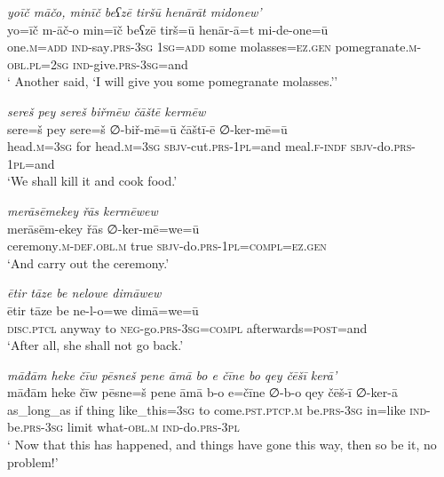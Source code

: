\ea \label{ZP.120}
\textit{yoīč māčo, minīč beʕzē tiršū henārāt midonew’} \\ 
\gll yo=īč m-āč-o min=īč beʕzē tirš=ū henār-ā=t mi-de-one=ū \\ 
 one\textsc{.m}\textsc{=add} \textsc{ind-}say\textsc{.prs}\textsc{-3sg} \textsc{1sg}\textsc{=add} some molasses\textsc{\textsc{=ez.gen}} pomegranate\textsc{.m}\textsc{-obl}\textsc{.pl}\textsc{=\textsc{2sg}} \textsc{ind-}give\textsc{.prs}\textsc{-3sg}=and \\ 
\glt ` Another said, ‘I will give you some pomegranate molasses.’'
\z 
 
\ea \label{ZP.122}
\textit{sereš pey sereš biřmēw čāštē kermēw} \\ 
\gll sere=š pey sere=š ∅-biř-mē=ū čāštī-ē ∅-ker-mē=ū \\ 
 head\textsc{.m}\textsc{=3sg} for head\textsc{.m}\textsc{=3sg} \textsc{sbjv-}cut\textsc{.prs}\textsc{-1pl}=and meal\textsc{.f}\textsc{-indf} \textsc{sbjv-}do\textsc{.prs}\textsc{-1pl}=and \\ 
\glt `We shall kill it and cook food.'
\z 
 
\ea \label{ZP.123}
\textit{merāsēmekey řās kermēwew} \\ 
\gll merāsēm-ekey řās ∅-ker-mē=we=ū \\ 
 ceremony\textsc{.m}\textsc{-def}\textsc{.obl}\textsc{.m} true \textsc{sbjv-}do\textsc{.prs}\textsc{-1pl}\textsc{=compl}\textsc{\textsc{=ez.gen}} \\ 
\glt `And carry out the ceremony.'
\z 
 
\ea \label{ZP.124}
\textit{ētir tāze be nelowe dimāwew} \\ 
\gll ētir tāze be ne-l-o=we dimā=we=ū \\ 
 \textsc{disc.ptcl} anyway to \textsc{neg-}go\textsc{.prs}\textsc{-3sg}\textsc{=compl} afterwards\textsc{=\textsc{post}}=and \\ 
\glt `After all, she shall not go back.'
\z 
 
\ea \label{ZP.125}
\textit{māđām heke čīw pēsneš pene āmā bo e čīne bo qey čēšī kerā’} \\ 
\gll māđām heke čīw pēsne=š pene āmā b-o e=čīne ∅-b-o qey čēš-ī ∅-ker-ā \\ 
 as\_long\_as if thing like\_this\textsc{=3sg} to come\textsc{.pst}\textsc{.ptcp}\textsc{.m} be\textsc{.prs}\textsc{-3sg} in=like \textsc{ind-}be\textsc{.prs}\textsc{-3sg} limit what\textsc{-obl}\textsc{.m} \textsc{ind-}do\textsc{.prs}\textsc{-3pl} \\ 
\glt ` Now that this has happened, and things have gone this way, then so be it, no problem!'
\z 
 
